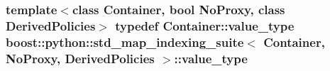 \hypertarget{classboost_1_1python_1_1std__map__indexing__suite_aff9ed68cf30e805a04a313d92c62ab38}{
\subsubsection[{value\-\_\-type}]{\setlength{\rightskip}{0pt plus 5cm}template$<$class Container, bool No\-Proxy, class Derived\-Policies$>$ typedef Container\-::value\-\_\-type {\bf boost\-::python\-::std\-\_\-map\-\_\-indexing\-\_\-suite}$<$ Container, No\-Proxy, Derived\-Policies $>$\-::{\bf value\-\_\-type}}}\label{classboost_1_1python_1_1std__map__indexing__suite_aff9ed68cf30e805a04a313d92c62ab38}


